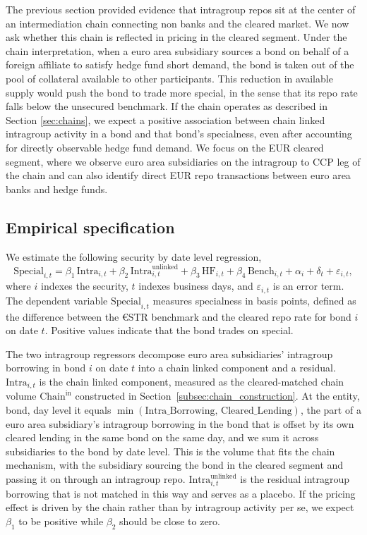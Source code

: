 \documentclass[english, 11pt, oneside, legal]{article}
\begin{document}
The previous section provided evidence that intragroup repos sit at the center of an intermediation chain connecting non banks and the cleared market. We now ask whether this chain is reflected in pricing in the cleared segment. Under the chain interpretation, when a euro area subsidiary sources a bond on behalf of a foreign affiliate to satisfy hedge fund short demand, the bond is taken out of the pool of collateral available to other participants. This reduction in available supply would push the bond to trade more special, in the sense that its repo rate falls below the unsecured benchmark. If the chain operates as described in Section \ref{sec:chains}, we expect a positive association between chain linked intragroup activity in a bond and that bond's specialness, even after accounting for directly observable hedge fund demand. We focus on the EUR cleared segment, where we observe euro area subsidiaries on the intragroup to CCP leg of the chain and can also identify direct EUR repo transactions between euro area banks and hedge funds.

\subsection{Empirical specification}

We estimate the following security by date level regression,
\begin{equation}
    \text{Special}_{i,t} = \beta_{1}\,\text{Intra}_{i,t} + \beta_{2}\,\text{Intra}^{\text{unlinked}}_{i,t} + \beta_{3}\,\text{HF}_{i,t} + \beta_{4}\,\text{Bench}_{i,t} + \alpha_{i} + \delta_{t} + \varepsilon_{i,t},
    \label{eq:specialness}
\end{equation}
where $i$ indexes the security, $t$ indexes business days, and $\varepsilon_{i,t}$ is an error term. The dependent variable $\text{Special}_{i,t}$ measures specialness in basis points, defined as the difference between the \euro{}STR benchmark and the cleared repo rate for bond $i$ on date $t$. Positive values indicate that the bond trades on special.

The two intragroup regressors decompose euro area subsidiaries' intragroup borrowing in bond $i$ on date $t$ into a chain linked component and a residual. $\text{Intra}_{i,t}$ is the chain linked component, measured as the cleared-matched chain volume $\text{Chain}^{\text{in}}$ constructed in Section~\ref{subsec:chain_construction}. At the entity, bond, day level it equals $\min(\text{Intra\_Borrowing},\,\text{Cleared\_Lending})$, the part of a euro area subsidiary's intragroup borrowing in the bond that is offset by its own cleared lending in the same bond on the same day, and we sum it across subsidiaries to the bond by date level. This is the volume that fits the chain mechanism, with the subsidiary sourcing the bond in the cleared segment and passing it on through an intragroup repo. $\text{Intra}^{\text{unlinked}}_{i,t}$ is the residual intragroup borrowing that is not matched in this way and serves as a placebo. If the pricing effect is driven by the chain rather than by intragroup activity per se, we expect $\beta_{1}$ to be positive while $\beta_{2}$ should be close to zero.
\end{document}
